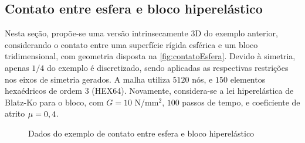 \documentclass[Tese.tex]{subfiles}
\begin{document}
\subsection{Contato entre esfera e bloco hiperelástico}\label{subsec:contatoEsfera}

Nesta seção, propõe-se uma versão intrinsecamente 3D do exemplo anterior, considerando o contato entre uma superfície rígida esférica e um bloco tridimensional, com geometria disposta na \autoref{fig:contatoEsfera}. Devido à simetria, apenas $1/4$ do exemplo é discretizado, sendo aplicadas as respectivas restrições nos eixos de simetria gerados. A malha utiliza $5120$ nós, e $150$ elementos hexaédricos de ordem 3 (HEX64). Novamente, considera-se a lei hiperelástica de Blatz-Ko para o bloco, com $G = 10$ N/mm$^2$, $100$ passos de tempo, e coeficiente de atrito $\mu = 0,4$.


\begin{figure}[!htb]
	\centering
	\caption{Dados do exemplo de contato entre esfera e bloco hiperelástico}
	\label{fig:contatoEsfera}
	{\small
		\noindent{}
	}	
\end{figure}
\end{document}
